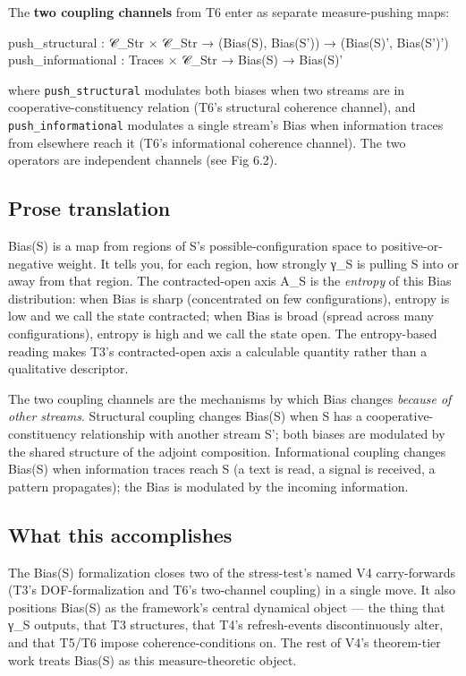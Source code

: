 \documentclass[11pt, openany]{book}
\begin{document}
The \textbf{two coupling channels} from T6 enter as separate measure-pushing maps:

\begin{Code}
push_structural : 𝒞_Str × 𝒞_Str → (Bias(S), Bias(S')) → (Bias(S)', Bias(S')')
push_informational : Traces × 𝒞_Str → Bias(S) → Bias(S)'
\end{Code}

where \texttt{push\_structural} modulates both biases when two streams are in cooperative-constituency relation (T6's structural coherence channel), and \texttt{push\_informational} modulates a single stream's Bias when information traces from elsewhere reach it (T6's informational coherence channel). The two operators are independent channels (see Fig 6.2).

\subsection{Prose translation}

Bias(S) is a map from regions of S's possible-configuration space to positive-or-negative weight. It tells you, for each region, how strongly γ\_\allowbreak{}S is pulling S into or away from that region. The contracted-open axis A\_\allowbreak{}S is the \textit{entropy} of this Bias distribution: when Bias is sharp (concentrated on few configurations), entropy is low and we call the state contracted; when Bias is broad (spread across many configurations), entropy is high and we call the state open. The entropy-based reading makes T3's contracted-open axis a calculable quantity rather than a qualitative descriptor.

The two coupling channels are the mechanisms by which Bias changes \textit{because of other streams}. Structural coupling changes Bias(S) when S has a cooperative-constituency relationship with another stream S'; both biases are modulated by the shared structure of the adjoint composition. Informational coupling changes Bias(S) when information traces reach S (a text is read, a signal is received, a pattern propagates); the Bias is modulated by the incoming information.

\subsection{What this accomplishes}

The Bias(S) formalization closes two of the stress-test's named V4 carry-forwards (T3's DOF-formalization and T6's two-channel coupling) in a single move. It also positions Bias(S) as the framework's central dynamical object --- the thing that γ\_\allowbreak{}S outputs, that T3 structures, that T4's refresh-events discontinuously alter, and that T5/T6 impose coherence-conditions on. The rest of V4's theorem-tier work treats Bias(S) as this measure-theoretic object.
\end{document}
